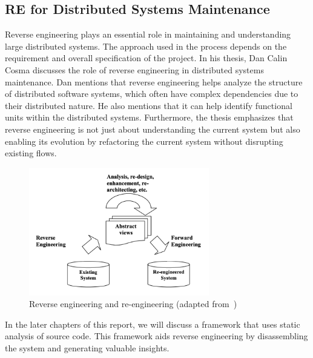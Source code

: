\subsection{RE for Distributed Systems Maintenance}
Reverse engineering plays an essential role in maintaining and understanding large distributed systems. The approach used in the process depends on the requirement and overall specification of the project. In his thesis, Dan Calin Cosma discusses the role of reverse engineering in distributed systems maintenance\citep{CosmaReOODS}. Dan mentions that reverse engineering helps analyze the structure of distributed software systems, which often have complex dependencies due to their distributed nature. He also mentions that it can help identify functional units within the distributed systems. Furthermore, the thesis emphasizes that reverse engineering is not just about understanding the current system but also enabling its evolution by refactoring the current system without disrupting existing flows.

\begin{figure}[H]
    \centering
    \includegraphics[width=0.7\textwidth]{figures/re_and_reengineering.png}
    \caption[Reverse engineering and re-engineering]{Reverse engineering and re-engineering (adapted from~\citep{SeMaintainance2001})}
    \label{fig:re_and_reengineering}
\end{figure}

In the later chapters of this report, we will discuss a framework that uses static analysis of source code. This framework aids reverse engineering by disassembling the system and generating valuable insights.
